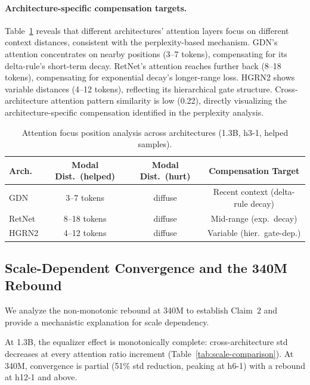 \documentclass[11pt,a4paper]{article}
\begin{document}
\paragraph{Architecture-specific compensation targets.}
Table~\ref{tab:attn-positions} reveals that different architectures' attention layers focus on different context distances, consistent with the perplexity-based mechanism.
GDN's attention concentrates on nearby positions (3--7 tokens), compensating for its delta-rule's short-term decay.
RetNet's attention reaches further back (8--18 tokens), compensating for exponential decay's longer-range loss.
HGRN2 shows variable distances (4--12 tokens), reflecting its hierarchical gate structure.
Cross-architecture attention pattern similarity is low (0.22), directly visualizing the architecture-specific compensation identified in the perplexity analysis.

\begin{table}[t]
\centering
\small
\caption{Attention focus position analysis across architectures (1.3B, h3-1, helped samples).}
\label{tab:attn-positions}
\begin{tabular}{lccc}
\toprule
\textbf{Arch.} & \textbf{Modal Dist.\ (helped)} & \textbf{Modal Dist.\ (hurt)} & \textbf{Compensation Target} \\
\midrule
GDN    & 3--7 tokens  & diffuse & Recent context (delta-rule decay) \\
RetNet & 8--18 tokens & diffuse & Mid-range (exp.\ decay) \\
HGRN2  & 4--12 tokens & diffuse & Variable (hier.\ gate-dep.) \\
\bottomrule
\end{tabular}
\end{table}


\subsection{Scale-Dependent Convergence and the 340M Rebound}
\label{sec:scale}

We analyze the non-monotonic rebound at 340M to establish Claim~2 and provide a mechanistic explanation for scale dependency.

At 1.3B, the equalizer effect is monotonically complete: cross-architecture std decreases at every attention ratio increment (Table~\ref{tab:scale-comparison}).
At 340M, convergence is partial (51\% std reduction, peaking at h6-1) with a rebound at h12-1 and above.
\end{document}
